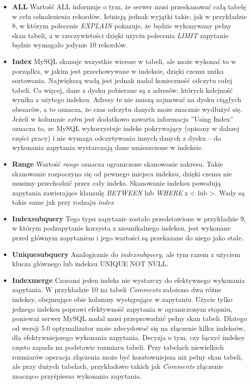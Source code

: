 \begin{itemize}
	\item \textbf{ALL} \newline
	Wartość ALL informuje o tym, że serwer musi przeskanować całą tabelę w celu odnalezienia rekordów. Istnieją jednak wyjątki takie, jak w przykładzie 8, w którym polecenie \textit{EXPLAIN} pokazuje, że będzie wykonywany pełny skan tabeli, a w rzeczywistości dzięki użyciu polecenia \textit{LIMIT} zapytanie będzie wymagało jedynie 10 rekordów.
	\item \textbf{Index} \newline
MySQL skanuje wszystkie wiersze w tabeli, ale może wykonać to w porządku, w jakim jest przechowywane w indeksie, dzięki czemu unika sortowania. Największą wadą jest jednak nadal konieczność odczytu całej tabeli. Co więcej, dane z dysku pobierane są z adresów, których kolejność wynika z użytego indeksu. Adresy te nie muszą zajmować na dysku ciągłych obszarów, a to oznacza, że czas odczytu danych może znacznie wydłużyć się. Jeżeli w kolumnie \textit{extra} jest dodatkowo zawarta informacja ''Using Index'' oznacza to, ze MySQL wykorzystuje indeks pokrywający (opisany w dalszej części pracy) i nie wymaga odczytywania innych danych z dysku – do wykonania zapytania wystarczają dane umieszczone w indeksie.
	\item \textbf{Range} \newline
	Wartość \textit{range} oznacza ograniczone skanowanie zakresu. Takie skanowanie rozpoczyna się od pewnego miejsca indeksu, dzięki czemu nie musimy przechodzić przez cały indeks. Skanowanie indeksu powodują zapytania zawierające klauzulę \textit{BETWEEN} lub \textit{WHERE} z < lub >. Wady są takie same jak przy rodzaju \textit{index}
	\item \textbf{Index\textunderscore subquery} \newline 
	Tego typu zapytanie zostało przedstawione w przykładzie 9, w którym podzapytanie korzysta z nieunikalnego indeksu, jest wykonane przed głównym zapytaniem i jego wartości są przekazane do niego jako stałe.
	\item\textbf{Unique\textunderscore subquery} \newline 
	Analogicznie do \textit{index\textunderscore subquery}, ale tym razem z użyciem klucza głównego lub indeksu UNIQUE NOT NULL.
	\item \textbf{Index\textunderscore merge} \newline
Czasami jeden indeks nie wystarczy do efektywnego wykonania zapytania. W  przykładzie 10 na tabeli \textit{Comments} założono dwa różne indeksy, obejmujące obie kolumny występujące w zapytaniu. Użycie tylko jednego indeksu poprawi  efektywność zapytania w ograniczonym stopniu, ponieważ serwer MySQL nadal musi przeprowadzić pełny skan tabeli. Dlatego od wersji 5.0 optymalizator może zdecydować się na złączenie kilku indeksów, dla efektywniejszego wykonania zapytania. Decyzja o tym, czy łączyć indeksy często zapada na podstawie rozmiaru tabeli. Przy tabelach niewielkich rozmiarów operacja złączenia może być kosztowniejsza niż pełny skan tabeli, ale przy dużych tabelach, przykładowo takich jak \textit{Comments} złączenie znacząco przyśpiesza wykonania zapytania. 

\end{itemize}
